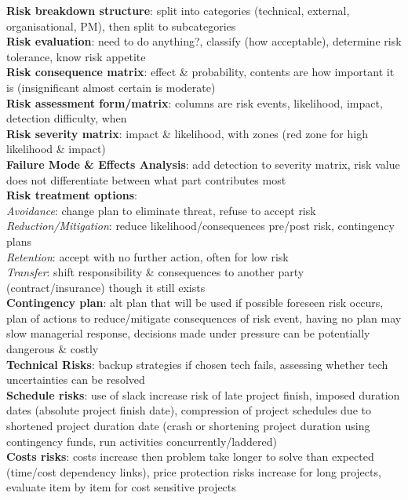 \documentclass[a4paper]{article}
\begin{document}
\begin{multicols}{3}
        \textbf{Risk breakdown structure}: split into categories (technical, external, organisational, PM), then split to subcategories\\
        \textbf{Risk evaluation}: need to do anything?, classify (how acceptable), determine risk tolerance, know risk appetite\\
        \textbf{Risk consequence matrix}: effect \& probability, contents are how important it is (insignificant almost certain is moderate)\\
        \textbf{Risk assessment form/matrix}: columns are risk events, likelihood, impact, detection difficulty, when\\
        \textbf{Risk severity matrix}: impact \& likelihood, with zones (red zone for high likelihood \& impact)\\
        \textbf{Failure Mode \& Effects Analysis}: add detection to severity matrix, risk value does not differentiate between what part contributes most\\
        \textbf{Risk treatment options}:\\
        \textit{Avoidance}: change plan to eliminate threat, refuse to accept risk\\
        \textit{Reduction/Mitigation}: reduce likelihood/consequences pre/post risk, contingency plans\\
        \textit{Retention}: accept with no further action, often for low risk\\
        \textit{Transfer}: shift responsibility \& consequences to another party (contract/insurance) though it still exists\\
        \textbf{Contingency plan}: alt plan that will be used if possible foreseen risk occurs, plan of actions to reduce/mitigate consequences of risk event, having no plan may slow managerial response, decisions made under pressure can be potentially dangerous \& costly\\
        \textbf{Technical Risks}: backup strategies if chosen tech fails, assessing whether tech uncertainties can be resolved\\
        \textbf{Schedule risks}: use of slack increase risk of late project finish, imposed duration dates (absolute project finish date), compression of project schedules due to shortened project duration date (crash or shortening project duration using contingency funds, run activities concurrently/laddered)\\
        \textbf{Costs risks}: costs increase then problem take longer to solve than expected (time/cost dependency links), price protection risks increase for long projects, evaluate item by item for cost sensitive projects\\

\end{multicols}
\end{document}

